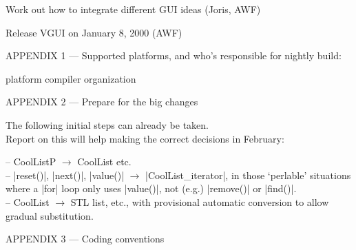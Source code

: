 \documentclass[11pt]{article}
\begin{document}
Work out how to integrate different GUI ideas (Joris, AWF)

Release VGUI on January 8, 2000 (AWF)

\newpage


APPENDIX 1 --- Supported platforms, and who's responsible for nightly build:

  \begin{tabbing}

platform \>	compiler	 \>	organization	\\

  \end{tabbing}

APPENDIX 2 --- Prepare for the big changes

The following initial steps can already be taken. \\
Report on this will help making the correct decisions in February:

-- CoolListP $\rightarrow$ CoolList etc. \\
-- |reset()|, |next()|, |value()| $\rightarrow$ |CoolList_iterator|, in
those `perlable' situations where a |for| loop only uses |value()|, not (e.g.)
|remove()| or |find()|. \\
-- CoolList $\rightarrow$ STL list, etc., with provisional automatic conversion
to allow gradual substitution.

\vskip1cm

APPENDIX 3 --- Coding conventions
\end{document}
